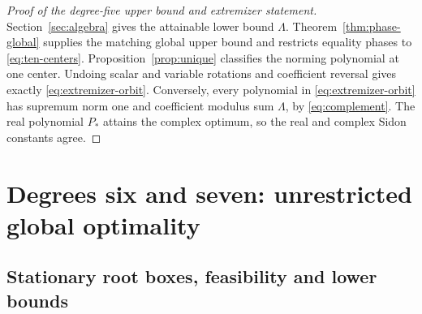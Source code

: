 \documentclass[11pt]{article}
\begin{document}
\begin{proof}[Proof of the degree-five upper bound and extremizer statement]
Section~\ref{sec:algebra} gives the attainable lower bound $\Lambda$. Theorem~\ref{thm:phase-global} supplies the matching global upper bound and restricts equality phases to \eqref{eq:ten-centers}. Proposition~\ref{prop:unique} classifies the norming polynomial at one center. Undoing scalar and variable rotations and coefficient reversal gives exactly \eqref{eq:extremizer-orbit}. Conversely, every polynomial in \eqref{eq:extremizer-orbit} has supremum norm one and coefficient modulus sum $\Lambda$, by \eqref{eq:complement}. The real polynomial $P_*$ attains the complex optimum, so the real and complex Sidon constants agree.
\end{proof}



\section{Degrees six and seven: unrestricted global optimality}\label{sec:sixseven}

\subsection{Stationary root boxes, feasibility and lower bounds}\label{sec:candidates}
\end{document}

